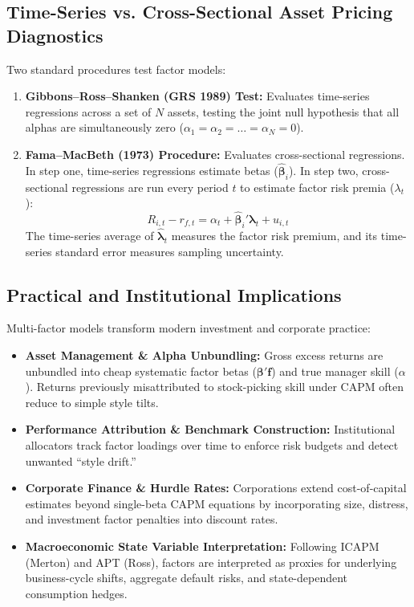 \subsection{Time-Series vs. Cross-Sectional Asset Pricing Diagnostics}
Two standard procedures test factor models:
\begin{enumerate}
  \item \textbf{Gibbons--Ross--Shanken (GRS 1989) Test:} Evaluates time-series regressions across a set of $N$ assets, testing the joint null hypothesis that all alphas are simultaneously zero ($\alpha_1 = \alpha_2 = \dots = \alpha_N = 0$).
  \item \textbf{Fama--MacBeth (1973) Procedure:} Evaluates cross-sectional regressions. In step one, time-series regressions estimate betas ($\hat{\boldsymbol{\beta}}_i$). In step two, cross-sectional regressions are run every period $t$ to estimate factor risk premia ($\lambda_t$):
  \begin{equation}
    R_{i,t} - r_{f,t} = \alpha_t + \hat{\boldsymbol{\beta}}_i' \boldsymbol{\lambda}_t + u_{i,t}
  \end{equation}
  The time-series average of $\hat{\boldsymbol{\lambda}}_t$ measures the factor risk premium, and its time-series standard error measures sampling uncertainty.
\end{enumerate}

\subsection{Practical and Institutional Implications}
Multi-factor models transform modern investment and corporate practice:
\begin{itemize}
  \item \textbf{Asset Management \& Alpha Unbundling:} Gross excess returns are unbundled into cheap systematic factor betas ($\boldsymbol{\beta}' \mathbf{f}$) and true manager skill ($\alpha$). Returns previously misattributed to stock-picking skill under CAPM often reduce to simple style tilts.
  \item \textbf{Performance Attribution \& Benchmark Construction:} Institutional allocators track factor loadings over time to enforce risk budgets and detect unwanted ``style drift.''
  \item \textbf{Corporate Finance \& Hurdle Rates:} Corporations extend cost-of-capital estimates beyond single-beta CAPM equations by incorporating size, distress, and investment factor penalties into discount rates.
  \item \textbf{Macroeconomic State Variable Interpretation:} Following ICAPM (Merton) and APT (Ross), factors are interpreted as proxies for underlying business-cycle shifts, aggregate default risks, and state-dependent consumption hedges.
\end{itemize}

